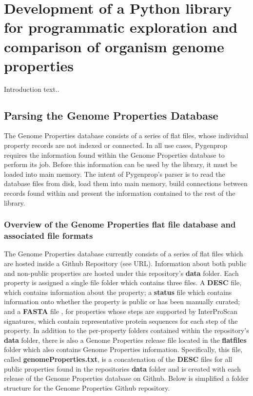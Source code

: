 \chapter{Development of a Python library for programmatic exploration and comparison of organism genome properties}

Introduction text..

\section{Parsing the Genome Properties Database}

The Genome Properties database consists of a series of flat files, whose individual property records are not indexed or connected. In all use cases, Pygenprop requires the information found within the Genome Properties database to perform its job. Before this information can be used by the library, it must be loaded into main memory. The intent of Pygenprop's parser is to read the database files from disk, load them into main memory, build connections between records found within and present the information contained to the rest of the library. 

\subsection{Overview of the Genome Properties flat file database and associated file formats}

The Genome Properties database currently consists of a series of flat files which are hosted inside a Github Repository (see URL). Information about both public and non-public properties are hosted under this repository's \textbf{data} folder. Each property is assigned a single file folder which contains three files. A \textbf{DESC} file, which contains information about the property; a \textbf{status} file which contains information onto whether the property is public or has been manually curated; and a \textbf{FASTA} file \cite{pearson19905}, for properties whose steps are supported by InterProScan signatures, which contain representative protein sequences for each step of the property. In addition to the per-property folders contained within the repository's \textbf{data} folder, there is also a Genome Properties release file located in the \textbf{flatfiles} folder which also contains Genome Properties information. Specifically, this file, called \textbf{genomeProperties.txt}, is a concatenation of the \textbf{DESC} files for all public properties found in the repositories \textbf{data} folder and is created with each release of the Genome Properties database on Github. Below is simplified a folder structure for the Genome Properties Github repository.


